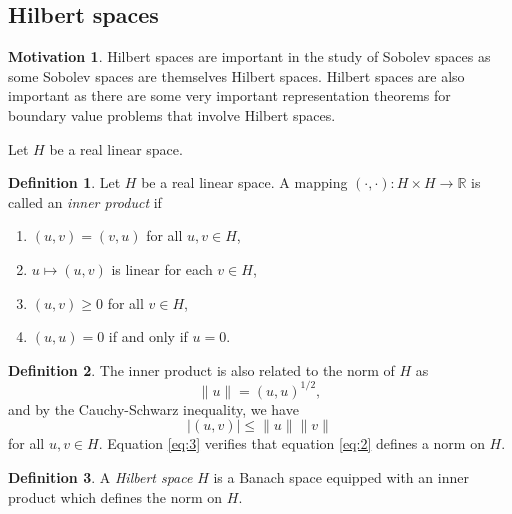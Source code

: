 \documentclass[11pt]{article}
\theoremstyle{definition}
\newtheorem*{definition}{Definition}
\newtheorem*{motivation}{Motivation}
\begin{document}
\newpage

\subsection{Hilbert spaces}
\begin{motivation}
	Hilbert spaces are important in the study of Sobolev spaces as some Sobolev spaces are themselves Hilbert spaces.
	Hilbert spaces are also important as there are some very important representation theorems for boundary value problems that involve Hilbert spaces.
\end{motivation}
Let $H$ be a real linear space.
\begin{definition}
	Let $H$ be a real linear space. A mapping $(\cdot , \cdot) : H \times H \rightarrow \mathbb{R}$ is called an \textit{inner product} if
	\begin{enumerate}
		\item $(u,v) = (v,u)$ for all $u,v \in H$,
		\item $u \mapsto (u,v)$ is linear for each $v \in H$,
		\item $(u,v) \geq 0$ for all $v \in H$,
		\item $(u,u) = 0$ if and only if $u = 0$.
	\end{enumerate}
\end{definition}
\begin{definition}
	The inner product is also related to the norm of $H$ as
	\begin{equation}
		\label{eq:2}
		\|u\| = (u,u)^{1/2},
	\end{equation}
	and by the Cauchy-Schwarz inequality, we have
	\begin{equation}
		\label{eq:3}
		|(u,v)| \leq \|u\|\|v\|
	\end{equation}
	for all $u,v \in H$. Equation \ref{eq:3} verifies that equation \ref{eq:2} defines a norm on $H$. 
\end{definition}
\begin{definition}
	A \textit{Hilbert space} $H$ is a Banach space equipped with an inner product which defines the norm on $H$.
\end{definition}
\end{document}
